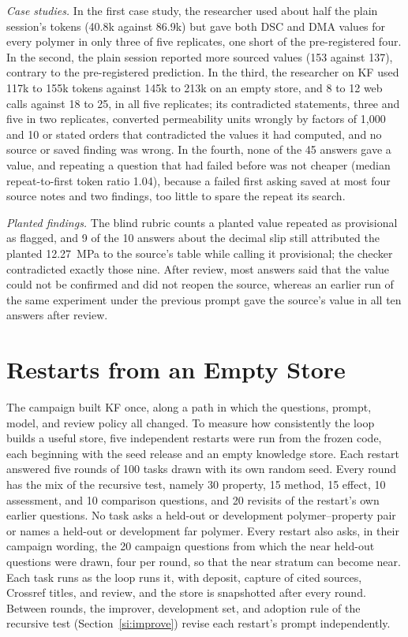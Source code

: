 \documentclass[journal=mamobx,manuscript=suppinfo]{achemso}
\begin{document}
\emph{Case studies.}
In the first case study, the researcher used about half the plain session's tokens (40.8k against 86.9k) but gave both DSC and DMA values for every polymer in only three of five replicates, one short of the pre-registered four.
In the second, the plain session reported more sourced values (153 against 137), contrary to the pre-registered prediction.
In the third, the researcher on KF used 117k to 155k tokens against 145k to 213k on an empty store, and 8 to 12 web calls against 18 to 25, in all five replicates; its contradicted statements, three and five in two replicates, converted permeability units wrongly by factors of 1,000 and 10 or stated orders that contradicted the values it had computed, and no source or saved finding was wrong.
In the fourth, none of the 45 answers gave a value, and repeating a question that had failed before was not cheaper (median repeat-to-first token ratio 1.04), because a failed first asking saved at most four source notes and two findings, too little to spare the repeat its search.

\emph{Planted findings.}
The blind rubric counts a planted value repeated as provisional as flagged, and 9 of the 10 answers about the decimal slip still attributed the planted \SI{12.27}{\mega\pascal} to the source's table while calling it provisional; the checker contradicted exactly those nine.
After review, most answers said that the value could not be confirmed and did not reopen the source, whereas an earlier run of the same experiment under the previous prompt gave the source's value in all ten answers after review.

\section{Restarts from an Empty Store}
\label{si:restarts}

The campaign built KF once, along a path in which the questions, prompt, model, and review policy all changed.
To measure how consistently the loop builds a useful store, five independent restarts were run from the frozen code, each beginning with the seed release and an empty knowledge store.
Each restart answered five rounds of 100 tasks drawn with its own random seed.
Every round has the mix of the recursive test, namely 30 property, 15 method, 15 effect, 10 assessment, and 10 comparison questions, and 20 revisits of the restart's own earlier questions.
No task asks a held-out or development polymer--property pair or names a held-out or development far polymer.
Every restart also asks, in their campaign wording, the 20 campaign questions from which the near held-out questions were drawn, four per round, so that the near stratum can become near.
Each task runs as the loop runs it, with deposit, capture of cited sources, Crossref titles, and review, and the store is snapshotted after every round.
Between rounds, the improver, development set, and adoption rule of the recursive test (Section~\ref{si:improve}) revise each restart's prompt independently.
\end{document}

